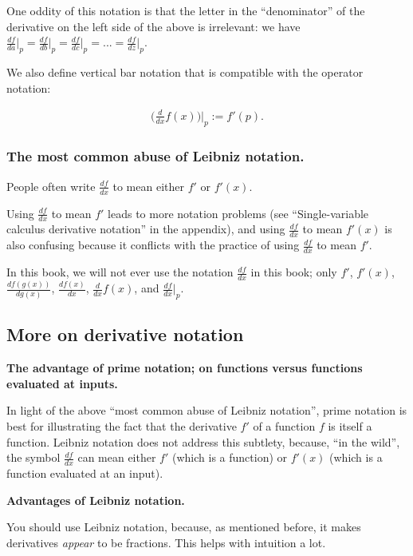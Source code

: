 One oddity of this notation is that the letter in the ``denominator'' of the derivative on the left side of the above is irrelevant: we have $\frac{df}{da}\Big|_p = \frac{df}{db}\Big|_p = \frac{df}{dc}\Big|_p = ... = \frac{df}{dz}\Big|_p$.

We also define vertical bar notation that is compatible with the operator notation:

\begin{align*}
    \Big(\frac{d}{dx}f(x)\Big)\Big|_p := f'(p).
\end{align*}

\subsubsection*{The most common abuse of Leibniz notation.}

People often write $\frac{df}{dx}$ to mean either $f'$ or $f'(x)$. 

Using $\frac{df}{dx}$ to mean $f'$ leads to more notation problems (see ``Single-variable calculus derivative notation'' in the appendix), and using $\frac{df}{dx}$ to mean $f'(x)$ is also confusing because it conflicts with the practice of using $\frac{df}{dx}$ to mean $f'$.

In this book, we will not ever use the notation $\frac{df}{dx}$ in this book; only $f'$, $f'(x)$, $\frac{df(g(x))}{dg(x)}$, $\frac{df(x)}{dx}$, $\frac{d}{dx}f(x)$, and $\frac{df}{dx}\Big|_p$.

\subsection*{More on derivative notation}

\indent \textbf{The advantage of prime notation; on functions versus functions evaluated at inputs.} 
         
In light of the above ``most common abuse of Leibniz notation'', prime notation is best for illustrating the fact that the derivative $f'$ of a function $f$ is itself a function. Leibniz notation does not address this subtlety, because, ``in the wild'', the symbol $\frac{df}{dx}$ can mean either $f'$ (which is a function) or $f'(x)$ (which is a function evaluated at an input).

\vspace{.5cm}

\textbf{Advantages of Leibniz notation.} 
         
You should use Leibniz notation, because, as mentioned before, it makes derivatives \textit{appear} to be fractions. This helps with intuition a lot.
         
